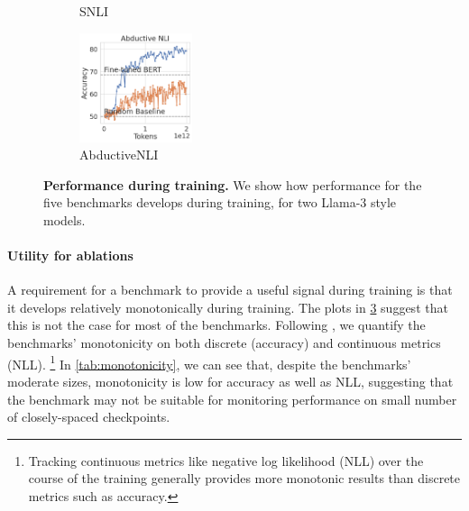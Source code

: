 \begin{figure}[t]
\begin{subfigure}[b]{0.19\textwidth}
    \caption{SNLI}
    \label{fig:snli_int}
    \end{subfigure}
    \begin{subfigure}[b]{0.19\textwidth}
    \centering
    \includegraphics[height=3.2cm, trim=11mm 0 0 0, clip]{figures/abductivenli_intermediate}
    \caption{AbductiveNLI}
    \label{fig:abductivenli_int}
    \end{subfigure}
    \caption{\textbf{Performance during training.} We show how performance for the five benchmarks develops during training, for two Llama-3 style models.}\label{fig:performance_training}
\end{figure}

\paragraph{Utility for ablations}
A requirement for a benchmark to provide a useful signal during training is that it develops relatively monotonically during training.
The plots in \cref{fig:performance_training} suggest that this is not the case for most of the benchmarks.
Following \citet{variancepaper}, we quantify the benchmarks' monotonicity on both discrete (accuracy) and continuous metrics (NLL).%
\footnote{Tracking continuous metrics like negative log likelihood (NLL) over the course of the training generally provides more monotonic results than discrete metrics such as accuracy.}
In \cref{tab:monotonicity}, we can see that, despite the benchmarks' moderate sizes, monotonicity is low for accuracy as well as NLL, suggesting that the benchmark may not be suitable for monitoring performance on small number of closely-spaced checkpoints.

